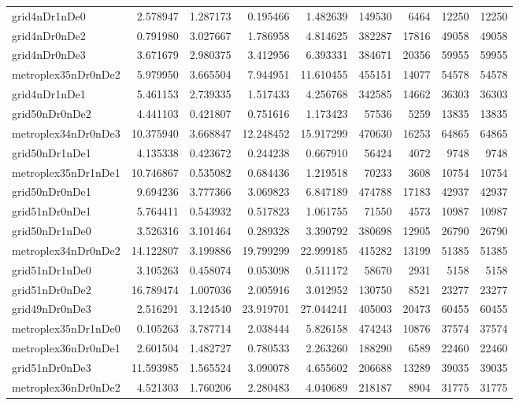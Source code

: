 \begin{longtable}{|l|r|r|r|r|r|r|r|r|}
grid4nDr1nDe0 & 2.578947 & 1.287173 & 0.195466 & 1.482639 & 149530 & 6464 & 12250 & 12250 \\
grid4nDr0nDe2 & 0.791980 & 3.027667 & 1.786958 & 4.814625 & 382287 & 17816 & 49058 & 49058 \\
grid4nDr0nDe3 & 3.671679 & 2.980375 & 3.412956 & 6.393331 & 384671 & 20356 & 59955 & 59955 \\
metroplex35nDr0nDe2 & 5.979950 & 3.665504 & 7.944951 & 11.610455 & 455151 & 14077 & 54578 & 54578 \\
grid4nDr1nDe1 & 5.461153 & 2.739335 & 1.517433 & 4.256768 & 342585 & 14662 & 36303 & 36303 \\
grid50nDr0nDe2 & 4.441103 & 0.421807 & 0.751616 & 1.173423 & 57536 & 5259 & 13835 & 13835 \\
metroplex34nDr0nDe3 & 10.375940 & 3.668847 & 12.248452 & 15.917299 & 470630 & 16253 & 64865 & 64865 \\
grid50nDr1nDe1 & 4.135338 & 0.423672 & 0.244238 & 0.667910 & 56424 & 4072 & 9748 & 9748 \\
metroplex35nDr1nDe1 & 10.746867 & 0.535082 & 0.684436 & 1.219518 & 70233 & 3608 & 10754 & 10754 \\
grid50nDr0nDe1 & 9.694236 & 3.777366 & 3.069823 & 6.847189 & 474788 & 17183 & 42937 & 42937 \\
grid51nDr0nDe1 & 5.764411 & 0.543932 & 0.517823 & 1.061755 & 71550 & 4573 & 10987 & 10987 \\
grid50nDr1nDe0 & 3.526316 & 3.101464 & 0.289328 & 3.390792 & 380698 & 12905 & 26790 & 26790 \\
metroplex34nDr0nDe2 & 14.122807 & 3.199886 & 19.799299 & 22.999185 & 415282 & 13199 & 51385 & 51385 \\
grid51nDr1nDe0 & 3.105263 & 0.458074 & 0.053098 & 0.511172 & 58670 & 2931 & 5158 & 5158 \\
grid51nDr0nDe2 & 16.789474 & 1.007036 & 2.005916 & 3.012952 & 130750 & 8521 & 23277 & 23277 \\
grid49nDr0nDe3 & 2.516291 & 3.124540 & 23.919701 & 27.044241 & 405003 & 20473 & 60455 & 60455 \\
metroplex35nDr1nDe0 & 0.105263 & 3.787714 & 2.038444 & 5.826158 & 474243 & 10876 & 37574 & 37574 \\
metroplex36nDr0nDe1 & 2.601504 & 1.482727 & 0.780533 & 2.263260 & 188290 & 6589 & 22460 & 22460 \\
grid51nDr0nDe3 & 11.593985 & 1.565524 & 3.090078 & 4.655602 & 206688 & 13289 & 39035 & 39035 \\
metroplex36nDr0nDe2 & 4.521303 & 1.760206 & 2.280483 & 4.040689 & 218187 & 8904 & 31775 & 31775 \\

\end{longtable}
